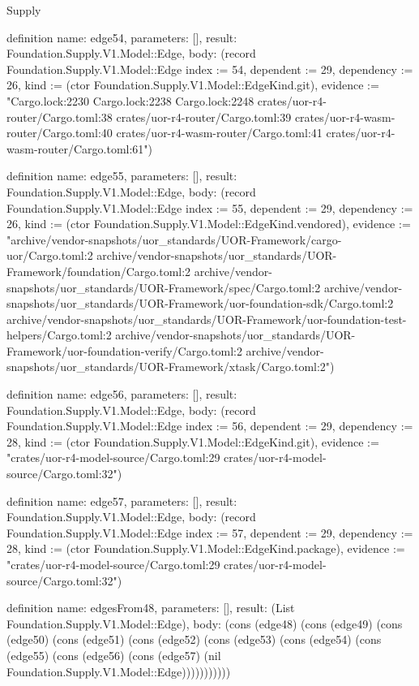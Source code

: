 \begin{lexlean}{Supply}
\begin{semanticmodule}
definition{
  name: edge54,
  parameters: [],
  result: Foundation.Supply.V1.Model::Edge,
  body: (record Foundation.Supply.V1.Model::Edge {index := 54, dependent := 29, dependency := 26, kind := (ctor Foundation.Supply.V1.Model::EdgeKind.git), evidence := "Cargo.lock:2230 Cargo.lock:2238 Cargo.lock:2248 crates/uor-r4-router/Cargo.toml:38 crates/uor-r4-router/Cargo.toml:39 crates/uor-r4-wasm-router/Cargo.toml:40 crates/uor-r4-wasm-router/Cargo.toml:41 crates/uor-r4-wasm-router/Cargo.toml:61"})
}

definition{
  name: edge55,
  parameters: [],
  result: Foundation.Supply.V1.Model::Edge,
  body: (record Foundation.Supply.V1.Model::Edge {index := 55, dependent := 29, dependency := 26, kind := (ctor Foundation.Supply.V1.Model::EdgeKind.vendored), evidence := "archive/vendor-snapshots/uor_standards/UOR-Framework/cargo-uor/Cargo.toml:2 archive/vendor-snapshots/uor_standards/UOR-Framework/foundation/Cargo.toml:2 archive/vendor-snapshots/uor_standards/UOR-Framework/spec/Cargo.toml:2 archive/vendor-snapshots/uor_standards/UOR-Framework/uor-foundation-sdk/Cargo.toml:2 archive/vendor-snapshots/uor_standards/UOR-Framework/uor-foundation-test-helpers/Cargo.toml:2 archive/vendor-snapshots/uor_standards/UOR-Framework/uor-foundation-verify/Cargo.toml:2 archive/vendor-snapshots/uor_standards/UOR-Framework/xtask/Cargo.toml:2"})
}

definition{
  name: edge56,
  parameters: [],
  result: Foundation.Supply.V1.Model::Edge,
  body: (record Foundation.Supply.V1.Model::Edge {index := 56, dependent := 29, dependency := 28, kind := (ctor Foundation.Supply.V1.Model::EdgeKind.git), evidence := "crates/uor-r4-model-source/Cargo.toml:29 crates/uor-r4-model-source/Cargo.toml:32"})
}

definition{
  name: edge57,
  parameters: [],
  result: Foundation.Supply.V1.Model::Edge,
  body: (record Foundation.Supply.V1.Model::Edge {index := 57, dependent := 29, dependency := 28, kind := (ctor Foundation.Supply.V1.Model::EdgeKind.package), evidence := "crates/uor-r4-model-source/Cargo.toml:29 crates/uor-r4-model-source/Cargo.toml:32"})
}

definition{
  name: edgesFrom48,
  parameters: [],
  result: (List Foundation.Supply.V1.Model::Edge),
  body: (cons (edge48) (cons (edge49) (cons (edge50) (cons (edge51) (cons (edge52) (cons (edge53) (cons (edge54) (cons (edge55) (cons (edge56) (cons (edge57) (nil Foundation.Supply.V1.Model::Edge)))))))))))
}


\end{semanticmodule}
\end{lexlean}

